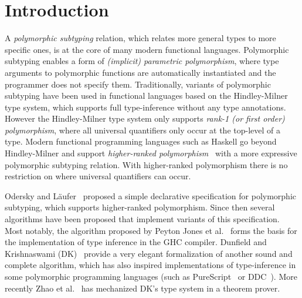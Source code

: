 \section{Introduction}

A \emph{polymorphic subtyping} relation, which relates more general
types to more specific ones, is at the core of many modern functional
languages. Polymorphic subtyping enables a form of
\emph{(implicit) parametric polymorphism}, where type arguments to polymorphic
functions are automatically instantiated and the programmer does not specify them.
Traditionally, variants of polymorphic subtyping have been used in functional languages based on the
Hindley-Milner~\cite{hindley1969principal,milner1978theory,damas1982principal}
type system, which supports full type-inference without any type annotations.
However the Hindley-Milner type system only supports \emph{rank-1 (or first order)
polymorphism}, where all universal quantifiers only occur at the top-level
of a type.  Modern functional programming languages such as Haskell go beyond
Hindley-Milner and support \emph{higher-ranked polymorphism}~\cite{odersky1996putting,jones2007practical}
with a more expressive
polymorphic subtyping relation. With higher-ranked
polymorphism there is no restriction on where universal quantifiers can occur.

Odersky and L\"aufer~\cite{odersky1996putting} proposed a
simple declarative specification for polymorphic subtyping, which supports higher-ranked polymorphism.
Since then several
algorithms have been proposed that implement variants of this specification. Most
notably, the algorithm proposed by Peyton Jones et al.~\cite{jones2007practical} forms the basis
for the implementation of type inference in the GHC compiler. 
Dunfield and Krishnaswami (DK)~\cite{dunfield2013complete} provide a very elegant
formalization of another sound and complete algorithm, which has 
also inspired implementations of type-inference in some polymorphic 
programming languages (such as PureScript~\cite{PureScript} or DDC~\cite{Disciple}).
More recently Zhao et al.~\cite{} has mechanized DK's type system in a theorem prover.


